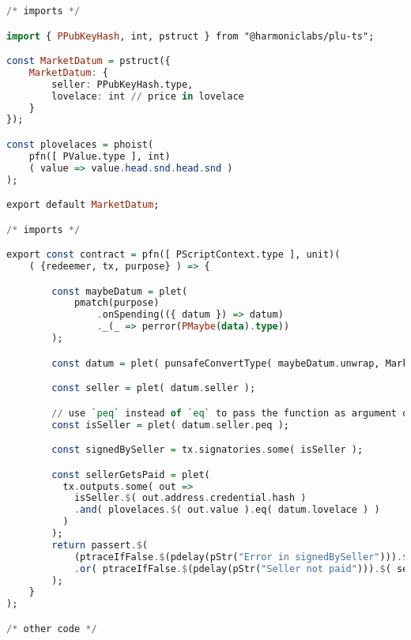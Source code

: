 \begin{lstlisting}[language=haskell, caption=Plu-ts Marketplace Contract]
/* imports */

import { PPubKeyHash, int, pstruct } from "@harmoniclabs/plu-ts";

const MarketDatum = pstruct({ 
    MarketDatum: { 
        seller: PPubKeyHash.type, 
        lovelace: int // price in lovelace
    }
});

const plovelaces = phoist(
    pfn([ PValue.type ], int)
    ( value => value.head.snd.head.snd )
);

export default MarketDatum;

/* imports */

export const contract = pfn([ PScriptContext.type ], unit)(
    ( {redeemer, tx, purpose} ) => {

        const maybeDatum = plet(
            pmatch(purpose)
                .onSpending(({ datum }) => datum)
                ._(_ => perror(PMaybe(data).type))
        );

        const datum = plet( punsafeConvertType( maybeDatum.unwrap, MarketDatum.type ) );

        const seller = plet( datum.seller );

        // use `peq` instead of `eq` to pass the function as argument or save it as variable
        const isSeller = plet( datum.seller.peq );

        const signedBySeller = tx.signatories.some( isSeller );

        const sellerGetsPaid = plet(
          tx.outputs.some( out => 
            isSeller.$( out.address.credential.hash )
            .and( plovelaces.$( out.value ).eq( datum.lovelace ) )
          )
        );
        return passert.$(
            (ptraceIfFalse.$(pdelay(pStr("Error in signedBySeller"))).$(signedBySeller))
            .or( ptraceIfFalse.$(pdelay(pStr("Seller not paid"))).$( sellerGetsPaid ) )
        );
    }
);

/* other code */
\end{lstlisting}


